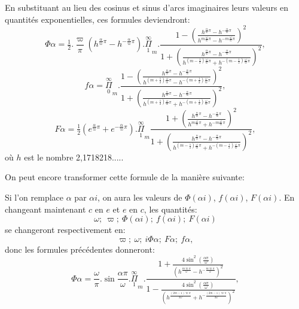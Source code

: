 \documentclass{article}
\begin{document}
En substituant au lieu des cosinus et sinus d'arcs imaginaires leurs valeurs en quantités exponentielles, ces formules deviendront:
\[
\Phi\alpha = \tfrac{1}{2}.\frac{\varpi}{\pi}\left(h^{\frac{\alpha}{\varpi}\pi}-h^{-\frac{\alpha}{\varpi}\pi}\right).\overset{\infty}{\underset{1}{\Pi}}_{m}.\frac{1-\left(\frac{h^{\frac{\alpha}{\varpi}\pi}-h^{-\frac{\alpha}{\varpi}\pi}}{h^{m\frac{\omega}{\varpi}\pi}-h^{-m\frac{\omega}{\varpi}\pi}}\right)^{2}}{1+\left(\frac{h^{\frac{\alpha}{\varpi}\pi}-h^{-\frac{\alpha}{\varpi}\pi}}{h^{(m-\frac{1}{2})\frac{\omega}{\varpi}\pi}+h^{-(m-\frac{1}{2})\frac{\omega}{\varpi}\pi}}\right)^{2}},
\tag{184.}
\]
\[
f\alpha = \overset{\infty}{\underset{0}{\Pi}}_{m}.\frac{1-\left(\frac{h^{\frac{\alpha}{\varpi}\pi}-h^{-\frac{\alpha}{\varpi}\pi}}{h^{(m+\frac{1}{2})\frac{\omega}{\varpi}\pi}-h^{-(m+\frac{1}{2})\frac{\omega}{\varpi}\pi}}\right)^{2}}{1+\left(\frac{h^{\frac{\alpha}{\varpi}\pi}-h^{-\frac{\alpha}{\varpi}\pi}}{h^{(m+\frac{1}{2})\frac{\omega}{\varpi}\pi}+h^{-(m+\frac{1}{2})\frac{\omega}{\varpi}\pi}}\right)^{2}},
\tag{185.}
\]
\[
F\alpha = \tfrac{1}{2}\left(e^{\frac{\alpha}{\varpi}\pi}+e^{-\frac{\alpha}{\varpi}\pi}\right).\overset{\infty}{\underset{1}{\Pi}}_{m}\frac{1+\left(\frac{h^{\frac{\alpha}{\varpi}\pi}-h^{-\frac{\alpha}{\varpi}\pi}}{h^{m\frac{\omega}{\varpi}\pi}+h^{-m\frac{\omega}{\varpi}\pi}}\right)^{2}}{1+\left(\frac{h^{\frac{\alpha}{\varpi}\pi}-h^{-\frac{\alpha}{\varpi}\pi}}{h^{(m-\frac{1}{2})\frac{\omega}{\varpi}\pi}+h^{-(m-\frac{1}{2})\frac{\omega}{\varpi}\pi}}\right)^{2}},
\tag{186.}
\]
où $h$ est le nombre 2,1718218.....
 

On peut encore transformer cette formule de la manière suivante:

Si l'on remplace $\alpha$ par $\alpha i$, on aura les valeurs de $\Phi(\alpha i)$, $f(\alpha i)$, $F(\alpha i)$. En changeant maintenant $c$ en $e$ et $e$ en $c$, les quantités:
\[
\omega;\ \varpi;\ \Phi(\alpha i);\ f(\alpha i);\ F(\alpha i)
\]
se changeront respectivement en:
\[
\varpi;\ \omega;\ i\Phi\alpha;\ F\alpha;\ f\alpha,
\]
donc les formules précédentes donneront:
\[
\Phi\alpha = \frac{\omega}{\pi}.\sin\frac{\alpha\pi}{\omega}.\overset{\infty}{\underset{1}{\Pi}}_{m}.\frac{1+\frac{4\sin^{2}\left(\frac{\alpha\pi}{\omega}\right)}{\left(h^{\frac{m\varpi\pi}{\omega}}-h^{-\frac{m\varpi\pi}{\omega}}\right)^{2}}}{1-\frac{4\sin^{2}\left(\frac{\alpha\pi}{\omega}\right)}{\left(h^{\frac{(2m-1)\varpi\pi}{2\omega}}+h^{-\frac{(2m-1)\varpi\pi}{2\omega}}\right)^{2}}},
\tag{187.}
\]
\end{document}
